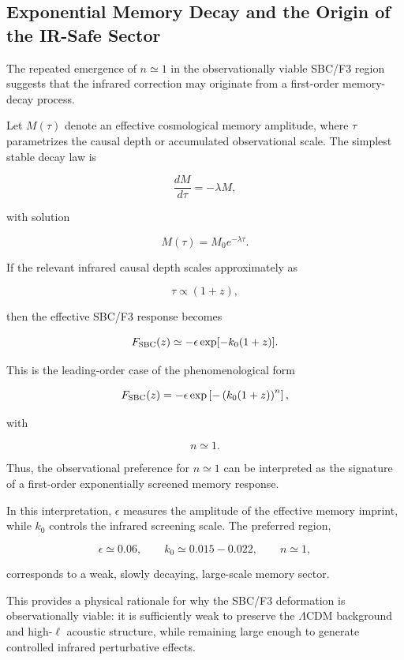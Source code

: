 \subsection{Exponential Memory Decay and the Origin of the IR-Safe Sector}

The repeated emergence of \(n\simeq 1\) in the observationally viable SBC/F3 region suggests that the infrared correction may originate from a first-order memory-decay process.

Let \(M(\tau)\) denote an effective cosmological memory amplitude, where \(\tau\) parametrizes the causal depth or accumulated observational scale. The simplest stable decay law is

\begin{equation}
\frac{dM}{d\tau}=-\lambda M,
\end{equation}

with solution

\begin{equation}
M(\tau)=M_0 e^{-\lambda \tau}.
\end{equation}

If the relevant infrared causal depth scales approximately as

\begin{equation}
\tau \propto (1+z),
\end{equation}

then the effective SBC/F3 response becomes

\begin{equation}
F_{\rm SBC}(z)
\simeq
-\epsilon \exp[-k_0(1+z)].
\end{equation}

This is the leading-order case of the phenomenological form

\begin{equation}
F_{\rm SBC}(z)
=
-\epsilon
\exp\left[-\left(k_0(1+z)\right)^n\right],
\end{equation}

with

\begin{equation}
n\simeq 1.
\end{equation}

Thus, the observational preference for \(n\simeq 1\) can be interpreted as the signature of a first-order exponentially screened memory response.

In this interpretation, \(\epsilon\) measures the amplitude of the effective memory imprint, while \(k_0\) controls the infrared screening scale. The preferred region,

\begin{equation}
\epsilon\simeq 0.06,
\qquad
k_0\simeq 0.015-0.022,
\qquad
n\simeq 1,
\end{equation}

corresponds to a weak, slowly decaying, large-scale memory sector.

This provides a physical rationale for why the SBC/F3 deformation is observationally viable: it is sufficiently weak to preserve the \(\Lambda\)CDM background and high-\(\ell\) acoustic structure, while remaining large enough to generate controlled infrared perturbative effects.
